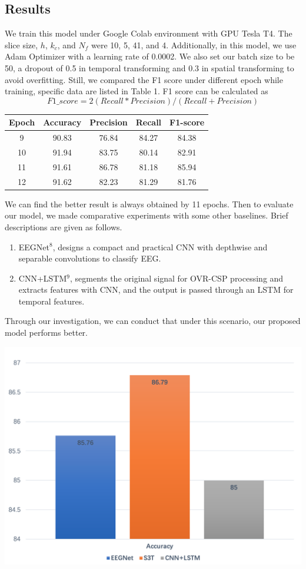 \documentclass[a0,portrait]{a0poster}
\begin{document}
\begin{minipage}[c]{\linewidth}
\begin{framed}
\begin{multicols}{2}
\section*{Results}
We train this model under Google Colab environment with GPU Tesla T4. The slice size, $h$, $k_c$, and $N_f$ were 10, 5, 41, and 4. Additionally, in this model, we use Adam Optimizer with a learning rate of 0.0002. We also set our batch size to be 50, a dropout of 0.5 in temporal transforming and 0.3 in spatial transforming to avoid overfitting. Still, we compared the F1 score under different epoch while training, specific data are listed in Table 1.  F1 score can be calculated as $$F1\_score = 2(Recall * Precision) / (Recall + Precision)$$
\vspace{0.1cm}
\begin{center}
\begin{tabular}{||c| c| c| c |c||} 
 \hline
 Epoch& Accuracy & Precision & Recall & F1-score\\ [1.5ex] 
 \hline\hline
 9 & 90.83 & 76.84 & 84.27 & 84.38 \\ 
 \hline
 10 & 91.94 & 83.75 & 80.14 & 82.91 \\
 \hline
 11 &91.61&86.78 & 81.18 & 85.94 \\
 \hline
 12 & 91.62 & 82.23 & 81.29 & 81.76 \\
 \hline
\end{tabular}
\end{center}
We can find the better result is always obtained by 11 epochs. Then to evaluate our model, we made comparative experiments with some other baselines. Brief descriptions are given as follows.
\begin{enumerate}
\item EEGNet$^8$, designs a compact and practical CNN with depthwise and separable convolutions to classify EEG.
\item CNN+LSTM$^9$, segments the original signal for OVR-CSP processing and extracts features with CNN, and the output is passed through an LSTM for temporal features.
\end{enumerate}
Through our investigation, we can conduct that under this scenario, our proposed model performs better.
\begin{center}
\includegraphics[width=0.7\linewidth]{figures/compare}

\end{center}
\end{multicols}
\end{framed}
\end{minipage}
\end{document}
